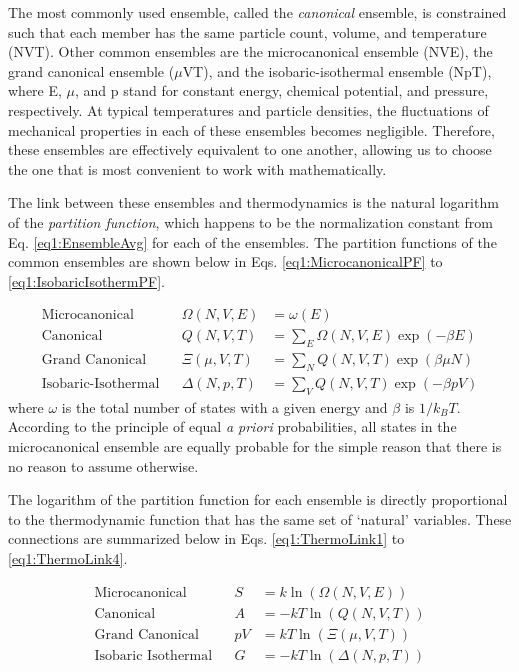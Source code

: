 The most commonly used ensemble, called the \emph{canonical} ensemble, is
constrained such that each member has the same particle count, volume, and
temperature (NVT). Other common ensembles are the microcanonical ensemble (NVE),
the grand canonical ensemble ($\mu$VT), and the isobaric-isothermal ensemble
(NpT), where E, $\mu$, and p stand for constant energy, chemical potential, and
pressure, respectively. At typical temperatures and particle densities, the
fluctuations of mechanical properties in each of these ensembles becomes
negligible. Therefore, these ensembles are effectively equivalent to one
another, allowing us to choose the one that is most convenient to work with
mathematically.

The link between these ensembles and thermodynamics is the natural logarithm of
the \emph{partition function}, which happens to be the normalization constant
from Eq. \ref{eq1:EnsembleAvg} for each of the ensembles. The partition
functions of the common ensembles are shown below in Eqs.
\ref{eq1:MicrocanonicalPF} to \ref{eq1:IsobaricIsothermPF}.

\begin{align}
   \text{Microcanonical} && \Omega(N, V, E) & = \omega(E) 
      \label{eq1:MicrocanonicalPF} \\
   \text{Canonical} && Q(N, V, T) & = \sum_E \Omega(N, V, E) 
               \exp(-\beta E) 
               \label{eq1:CanonicalPF} \\
   \text{Grand Canonical} && \Xi(\mu, V, T) & = \sum _ N 
               Q(N, V, T) \exp(\beta \mu N) 
               \label{eq1:GrandCanonicalPF} \\
   \text{Isobaric-Isothermal} && \Delta(N, p, T) & = \sum _ V
               Q(N, V, T) \exp(-\beta p V)
               \label{eq1:IsobaricIsothermPF}
\end{align}
where $\omega$ is the total number of states with a given energy and $\beta$ is
$1 / k_BT$. According to the principle of equal \emph{a priori} probabilities,
all states in the microcanonical ensemble are equally probable for the simple
reason that there is no reason to assume otherwise.

The logarithm of the partition function for each ensemble is directly
proportional to the thermodynamic function that has the same set of `natural'
variables. These connections are summarized below in Eqs. \ref{eq1:ThermoLink1}
to \ref{eq1:ThermoLink4}. \cite{McQuarrie_Book_StatMech_1973}

\begin{align}
   \text{Microcanonical} && S & = k \ln \left ( \Omega (N, V, E) \right ) 
      \label{eq1:ThermoLink1} \\
   \text{Canonical} && A & = -kT \ln \left ( Q (N, V, T) \right ) 
      \label{eq1:ThermoLink2} \\
   \text{Grand Canonical} && p V & = kT \ln \left ( \Xi (\mu, V, T) \right ) 
      \label{eq1:ThermoLink3} \\
   \text{Isobaric Isothermal} && G & = - kT \ln \left ( \Delta (N, p, T) \right )
      \label{eq1:ThermoLink4}
\end{align}

